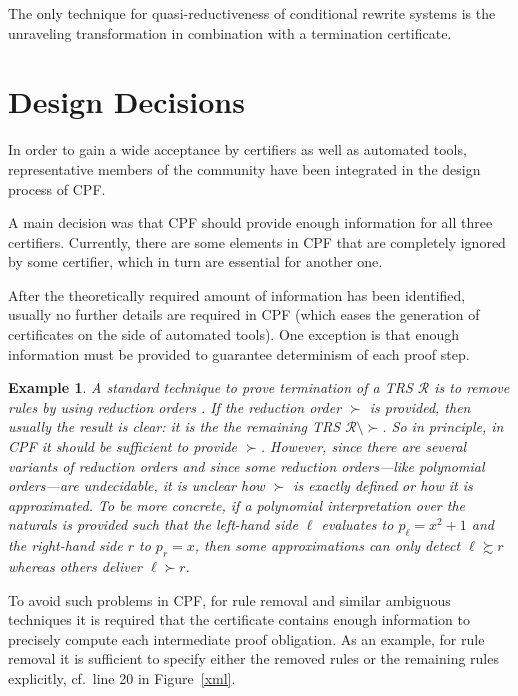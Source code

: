 \documentclass[USenglish]{eptcs}
\newcommand\RR{\ensuremath{\mathcal{R}}\xspace}
\newcommand{\rFI}[1]{Figure~\ref{#1}}
\newtheorem{example}{Example}
\begin{document}
The only technique for quasi-reductiveness of conditional rewrite systems 
is the unraveling transformation in
combination with a termination certificate.


\section{Design Decisions}

In order to gain a wide acceptance by  certifiers as well as automated tools,
representative members of the community have been integrated in the design
process of CPF. 

A main decision was that CPF should provide enough information for all three
certifiers. Currently, there are some elements in CPF that are completely
ignored by some certifier, which in turn are essential for another one. 

After the theoretically required amount of information has been identified,
usually no further details are required in CPF (which eases the generation of
certificates on the side of automated tools).  One exception is that enough
information must be provided to guarantee determinism of each proof step.

\begin{example}
A standard technique to prove termination of a TRS $\RR$ is to 
remove rules by using reduction orders \cite{L79,HM07}.
If the reduction order $\succ$ is provided, 
then usually the result is clear: it is the the remaining TRS $\RR \setminus {\succ}$. 
So in principle, in CPF it should be sufficient to provide $\succ$. However,
since there are several variants of reduction orders and since some reduction
orders---like polynomial orders---are undecidable, it is unclear how $\succ$ is exactly
defined or how it is approximated. To be more concrete, if a polynomial interpretation
over the naturals is provided such that the left-hand side $\ell$ evaluates 
to $p_\ell = x^2 + 1$ and the 
right-hand side $r$ to $p_r = x$, then some approximations can only detect
$\ell \succsim r$ whereas others deliver $\ell \succ r$.
\end{example}

To avoid such problems in CPF, for rule removal and similar ambiguous techniques it is required that the certificate contains enough information to precisely compute each intermediate
proof obligation. As an example, for rule removal it is sufficient to specify either the
removed rules or the remaining rules explicitly, cf.\ line 20 in \rFI{xml}.
\end{document}
